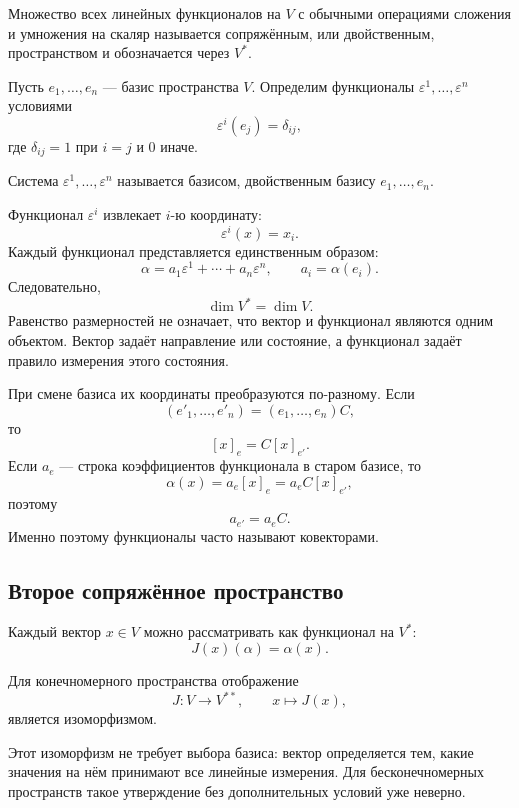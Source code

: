 \begin{definition}
Множество всех линейных функционалов на \(V\) с обычными операциями сложения и умножения на скаляр называется сопряжённым, или двойственным, пространством и обозначается через \(V^*\).
\end{definition}

Пусть \(e_1,\dots,e_n\) --- базис пространства \(V\). Определим функционалы \(\varepsilon^1,\dots,\varepsilon^n\) условиями
\[
\varepsilon^i(e_j)=\delta_{ij},
\]
где \(\delta_{ij}=1\) при \(i=j\) и \(0\) иначе.

\begin{definition}
Система \(\varepsilon^1,\dots,\varepsilon^n\) называется базисом, двойственным базису \(e_1,\dots,e_n\).
\end{definition}

Функционал \(\varepsilon^i\) извлекает \(i\)-ю координату:
\[
\varepsilon^i(x)=x_i.
\]
Каждый функционал представляется единственным образом:
\[
\alpha=a_1\varepsilon^1+\cdots+a_n\varepsilon^n,
\qquad
 a_i=\alpha(e_i).
\]
Следовательно,
\[
\dim V^*=\dim V.
\]
Равенство размерностей не означает, что вектор и функционал являются одним объектом. Вектор задаёт направление или состояние, а функционал задаёт правило измерения этого состояния.

При смене базиса их координаты преобразуются по-разному. Если
\[
(e'_1,\dots,e'_n)=(e_1,\dots,e_n)C,
\]
то
\[
[x]_e=C[x]_{e'}.
\]
Если \(a_e\) --- строка коэффициентов функционала в старом базисе, то
\[
\alpha(x)=a_e[x]_e=a_eC[x]_{e'},
\]
поэтому
\[
a_{e'}=a_eC.
\]
Именно поэтому функционалы часто называют ковекторами.

\subsection{Второе сопряжённое пространство}

Каждый вектор \(x\in V\) можно рассматривать как функционал на \(V^*\):
\[
J(x)(\alpha)=\alpha(x).
\]

\begin{theorem}
Для конечномерного пространства отображение
\[
J:V\to V^{**},
\qquad
x\mapsto J(x),
\]
является изоморфизмом.
\end{theorem}

Этот изоморфизм не требует выбора базиса: вектор определяется тем, какие значения на нём принимают все линейные измерения. Для бесконечномерных пространств такое утверждение без дополнительных условий уже неверно.

